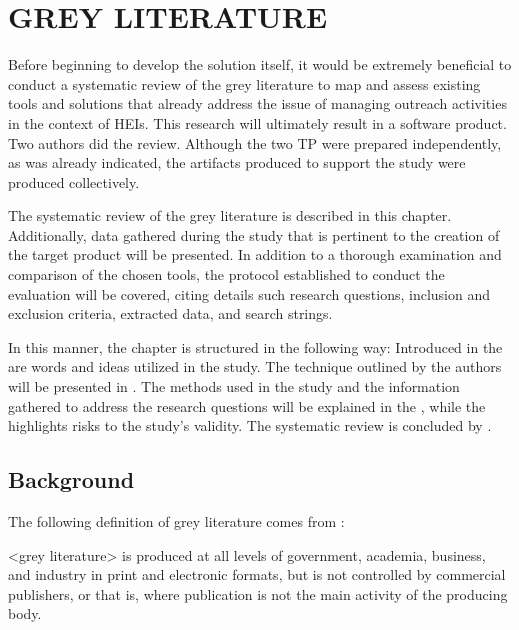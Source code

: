 \chapter{GREY LITERATURE}\label{grey_literature}

Before beginning to develop the solution itself, it would be extremely beneficial to conduct a systematic review of the grey literature to map and assess existing tools and solutions that already address the issue of managing outreach activities in the context of \acp{HEI}. This research will ultimately result in a software product. Two authors did the review. Although the two \ac{TP} were prepared independently, as was already indicated, the artifacts produced to support the study were produced collectively.

The systematic review of the grey literature is described in this chapter. Additionally, data gathered during the study that is pertinent to the creation of the target product will be presented. In addition to a thorough examination and comparison of the chosen tools, the protocol established to conduct the evaluation will be covered, citing details such research questions, inclusion and exclusion criteria, extracted data, and search strings.

In this manner, the chapter is structured in the following way: Introduced in the  are words and ideas utilized in the study. The technique outlined by the authors will be presented in . The methods used in the study and the information gathered to address the research questions will be explained in the , while the  highlights risks to the study's validity. The systematic review is concluded by .

\section{Background}\label{sec:gl-background}

The following definition of grey literature comes from \textcite[p.2]{garousi2019guidelines}:
\begin{citacao}
  <grey literature> is produced at all levels of government, academia, business, and industry in print and electronic formats, but is not controlled by commercial publishers, or that is, where publication is not the main activity of the producing body.
\end{citacao}

